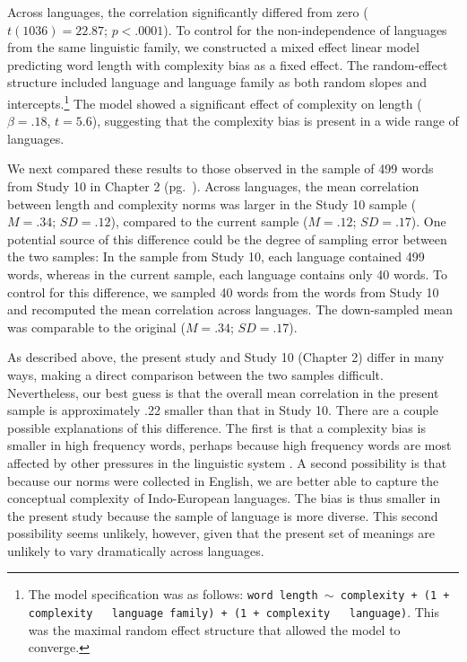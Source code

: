 Across languages,  the correlation significantly differed from zero ($ t(1036)= 22.87$; $p <.0001$).  To control for the non-independence of languages from the same linguistic family, we constructed a mixed effect linear model predicting word length with complexity bias as a fixed effect. The random-effect structure included language and language family as both random slopes and intercepts.\footnote{The model specification was as follows: \texttt{word length $\sim$ complexity + (1 + complexity ~\textbar~language family) +  (1 + complexity ~\textbar~language)}. This was the maximal random effect structure that allowed the model to converge.}  The model showed a significant effect of complexity on length ($\beta = .18$, $t = 5.6$), suggesting that the complexity bias is present in a wide range of languages.

We next compared these results to those observed in the sample of 499 words from Study 10 in Chapter 2 (pg.\ \pageref{ch2-10}). Across languages, the mean correlation between length and complexity norms was larger in the Study 10 sample ($M = .34$; $SD = .12$), compared to the current sample ($M = .12$; $SD = .17$). One potential source of this difference could be the degree of sampling error between the two samples: In the sample from Study 10, each language contained 499 words, whereas in the current sample, each language contains only 40 words. To control for this difference, we sampled 40 words from the words from Study 10 and recomputed  the mean correlation across languages. The down-sampled mean was comparable to the original  ($M = .34$; $SD = .17$). 

As described above, the present study and Study 10 (Chapter 2) differ in many ways, making a direct comparison between the two samples difficult. Nevertheless, our best guess is that the overall mean correlation in the present sample is approximately .22  smaller than that in Study 10.  There are a couple possible explanations of this difference. The first is that a complexity bias is smaller in high frequency words, perhaps because high frequency words are most affected by other pressures in the linguistic system \cite{lieberman2007quantifying}. A second possibility is that because our norms were collected in English, we are better able to capture the conceptual complexity of Indo-European languages. The bias is thus smaller in the present study because the sample of language is more diverse.  This second possibility seems unlikely, however, given that the present set of meanings are unlikely to vary dramatically across languages. 

